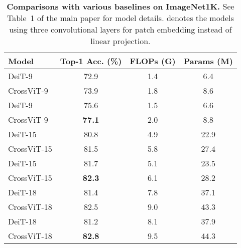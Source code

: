 \documentclass[10pt,twocolumn,letterpaper]{article}
\def\ours{CrossViT\xspace}
\begin{document}
\begin{table}[!b]
    \centering
    \begin{adjustbox}{max width=\linewidth}
    \begin{tabular}{l|c|c|c}
        \toprule
             Model   & Top-1 Acc. (\%) & FLOPs (G) & Params (M)  \\ 
        \midrule
DeiT-9 & 72.9 & 1.4 & 6.4\\
            \ours-9 & 73.9 & 1.8 & 8.6 \\
            DeiT-9 & 75.6 &  1.5 & 6.6\\
             \ours-9 & \textbf{77.1} & 2.0 & 8.8 \\
             


             


\midrule
DeiT-15 & 80.8 & 4.9 & 22.9 \\
            \ours-15&  81.5 & 5.8& 27.4 \\
            DeiT-15 & 81.7 & 5.1 & 23.5\\
            \ours-15 & \textbf{82.3} & 6.1 & 28.2 \\ 
            \midrule
DeiT-18 & 81.4 & 7.8 & 37.1\\
            \ours-18& 82.5 & 9.0 & 43.3 \\ 


DeiT-18 & 81.2 & 8.1 & 37.9 \\
            \ours-18 & \textbf{82.8} & 9.5 & 44.3 \\ 
        \bottomrule
    \end{tabular}
    \end{adjustbox}
\caption{\textbf{Comparisons with various baselines on ImageNet1K.} See Table~1 of the main paper for model details.  denotes the models using three convolutional layers for patch embedding instead of linear projection.}
    \label{table:more_baselines}
\end{table}

 
\end{document}
